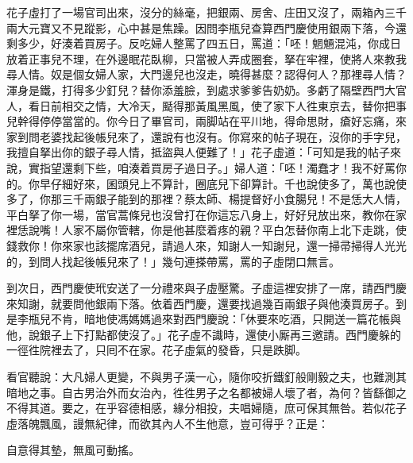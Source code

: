 花子虛打了一場官司出來，沒分的絲毫，把銀兩、房舍、庄田又沒了，兩箱內三千兩大元寶又不見蹤影，心中甚是焦躁。因問李瓶兒查算西門慶使用銀兩下落，今還剩多少，好湊着買房子。反吃婦人整罵了四五日，罵道：「呸！魍魎混沌，{}你成日放着正事兒不理，在外邊眠花臥柳，只當被人弄成圈套，拏在牢裡，使將人來教我尋人情。奴是個女婦人家，大門邊兒也沒走，曉得甚麼？認得何人？那裡尋人情？渾身是鐵，打得多少釘兒？替你添羞臉，到處求爹爹告奶奶。多虧了隔壁西門大官人，{}看日前相交之情，大冷天，颳得那黃風黑風，使了家下人徃東京去，替你把事兒幹得停停當當的。你今日了畢官司，兩脚站在平川地，得命思財，瘡好忘痛，來家到問老婆找起後帳兒來了，還說有也沒有。你寫來的帖子現在，沒你的手字兒，我擅自拏出你的銀子尋人情，抵盜與人便難了！」{}{}花子虛道：「可知是我的帖子來說，{}實指望還剩下些，咱湊着買房子過日子。」婦人道：「呸！濁蠢才！我不好罵你的。你早仔細好來，囷頭兒上不算計，圈底兒下卻算計。千也說使多了，萬也說使多了，你那三千兩銀子能到的那裡？蔡太師、楊提督好小食腸兒！不是恁大人情，平白拏了你一場，當官蒿條兒也沒曾打在你這忘八身上，好好兒放出來，教你在家裡恁說嘴！人家不屬你管轄，你是他甚麼着疼的親？平白怎替你南上北下走跳，使錢救你！你來家也該擺席酒兒，請過人來，知謝人一知謝兒，還一掃帚掃得人光光的，到問人找起後帳兒來了！」幾句連搽帶罵，罵的子虛閉口無言。

到次日，西門慶使玳安送了一分禮來與子虛壓驚。子虛這裡安排了一席，請西門慶來知謝，就要問他銀兩下落。依着西門慶，還要找過幾百兩銀子與他湊買房子。到是李瓶兒不肯，{}暗地使馮媽媽過來對西門慶說：「休要來吃酒，只開送一篇花帳與他，說銀子上下打點都使沒了。」花子虛不識時，還使小厮再三邀請。西門慶躲的一徑徃院裡去了，只囘不在家。花子虛氣的發昏，只是跌脚。

看官聽說：大凡婦人更變，不與男子漢一心，隨你咬折鐵釘般剛毅之夫，也難測其暗地之事。自古男治外而女治內，徃徃男子之名都被婦人壞了者，為何？皆繇御之不得其道。要之，在乎容德相感，緣分相投，夫唱婦隨，庶可保其無咎。若似花子虛落魄飄風，謾無紀律，而欲其內人不生他意，豈可得乎？正是：

\begin{myquote}
自意得其墊，無風可動搖。
\end{myquote}

